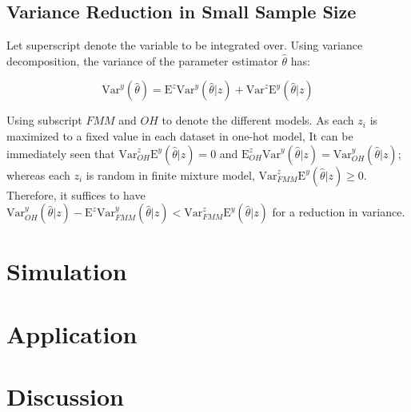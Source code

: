 \documentclass[12pt]{article}
\begin{document}
\subsection{Variance Reduction in Small Sample Size}

Let superscript denote the variable to be integrated over.
Using variance decomposition, the variance of the parameter estimator $\hat\theta$ has:

$$\mbox{Var}^{y} (\hat\theta) = \mbox{E}^{z}\mbox{Var}^{y} (\hat\theta| z) + \mbox{Var}^{z}\mbox{E}^{y} (\hat \theta| z)$$

Using subscript $FMM$ and $OH$ to denote the different models. As each $z_i$ is maximized to a fixed value in each dataset in one-hot model, It can be immediately seen that $\mbox{Var}_{OH}^{z}\mbox{E}^{y} (\hat \theta| z)=0$ and $\mbox{E}^{z}_{OH}\mbox{Var}^{y} (\hat\theta| z) = \mbox{Var}^{y}_{OH} (\hat\theta| z)$; whereas each $z_i$ is random in finite mixture model, $\mbox{Var}_{FMM}^{z}\mbox{E}^{y} (\hat \theta| z)\ge 0$. Therefore, it suffices to have $\mbox{Var}_{OH}^{y} (\hat\theta| z) - \mbox{E}^{z}\mbox{Var}^{y}_{FMM} (\hat\theta| z) < \mbox{Var}_{FMM}^{z}\mbox{E}^{y} (\hat \theta| z)$ for a reduction in variance.


\section{Simulation}




\section{Application}
\section{Discussion}



\end{document}
